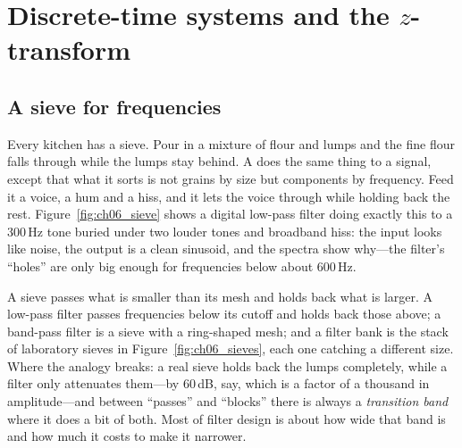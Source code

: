 \section{Discrete-time systems and the \texorpdfstring{$z$}{z}-transform}
\label{sec:ch06:ztrans}

\subsection{A sieve for frequencies}

Every kitchen has a sieve. Pour in a mixture of flour and lumps and the fine flour falls through
while the lumps stay behind. A  does the same thing to a signal, except that what it
sorts is not grains by size but components by frequency. Feed it a voice, a hum and a hiss, and
it lets the voice through while holding back the rest. Figure~\ref{fig:ch06_sieve} shows a
digital low-pass filter doing exactly this to a 300\,Hz tone buried under two louder tones and
broadband hiss: the input looks like noise, the output is a clean sinusoid, and the spectra show
why---the filter's ``holes'' are only big enough for frequencies below about 600\,Hz.


\begin{analogy}
A sieve passes what is smaller than its mesh and holds back what is larger. A low-pass filter
passes frequencies below its cutoff and holds back those above; a band-pass filter is a sieve with
a ring-shaped mesh; and a filter bank is the stack of laboratory sieves in
Figure~\ref{fig:ch06_sieves}, each one catching a different size. Where the analogy breaks: a real
sieve holds back the lumps completely, while a filter only attenuates them---by 60\,dB, say, which
is a factor of a thousand in amplitude---and between ``passes'' and ``blocks'' there is always a
\emph{transition band} where it does a bit of both. Most of filter design is about how wide that
band is and how much it costs to make it narrower.
\end{analogy}

